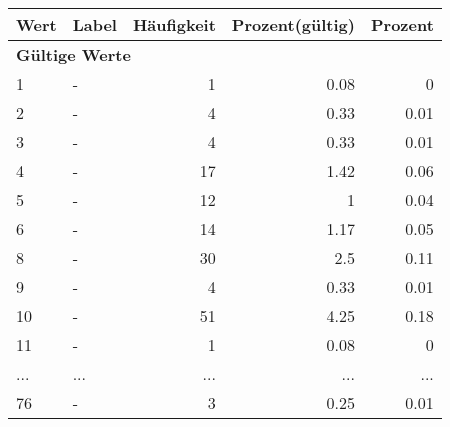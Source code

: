      \begin{longtable}{lXrrr}
     \toprule
     \textbf{Wert} & \textbf{Label} & \textbf{Häufigkeit} & \textbf{Prozent(gültig)} & \textbf{Prozent} \\
     \endhead
     \midrule
     \multicolumn{5}{l}{\textbf{Gültige Werte}}\\
        1 & \multicolumn{1}{X}{-} & %
          \num{1} &
          \num[round-mode=places,round-precision=2]{0,08} &
          \num[round-mode=places,round-precision=2]{0} \\
        2 & \multicolumn{1}{X}{-} & %
          \num{4} &
          \num[round-mode=places,round-precision=2]{0,33} &
          \num[round-mode=places,round-precision=2]{0,01} \\
        3 & \multicolumn{1}{X}{-} & %
          \num{4} &
          \num[round-mode=places,round-precision=2]{0,33} &
          \num[round-mode=places,round-precision=2]{0,01} \\
        4 & \multicolumn{1}{X}{-} & %
          \num{17} &
          \num[round-mode=places,round-precision=2]{1,42} &
          \num[round-mode=places,round-precision=2]{0,06} \\
        5 & \multicolumn{1}{X}{-} & %
          \num{12} &
          \num[round-mode=places,round-precision=2]{1} &
          \num[round-mode=places,round-precision=2]{0,04} \\
        6 & \multicolumn{1}{X}{-} & %
          \num{14} &
          \num[round-mode=places,round-precision=2]{1,17} &
          \num[round-mode=places,round-precision=2]{0,05} \\
        8 & \multicolumn{1}{X}{-} & %
          \num{30} &
          \num[round-mode=places,round-precision=2]{2,5} &
          \num[round-mode=places,round-precision=2]{0,11} \\
        9 & \multicolumn{1}{X}{-} & %
          \num{4} &
          \num[round-mode=places,round-precision=2]{0,33} &
          \num[round-mode=places,round-precision=2]{0,01} \\
        10 & \multicolumn{1}{X}{-} & %
          \num{51} &
          \num[round-mode=places,round-precision=2]{4,25} &
          \num[round-mode=places,round-precision=2]{0,18} \\
        11 & \multicolumn{1}{X}{-} & %
          \num{1} &
          \num[round-mode=places,round-precision=2]{0,08} &
          \num[round-mode=places,round-precision=2]{0} \\
       ... & ... & ... & ... & ... \\
        76 & \multicolumn{1}{X}{-} & %
          \num{3} &
          \num[round-mode=places,round-precision=2]{0,25} &
          \num[round-mode=places,round-precision=2]{0,01} \\


\end{longtable}
